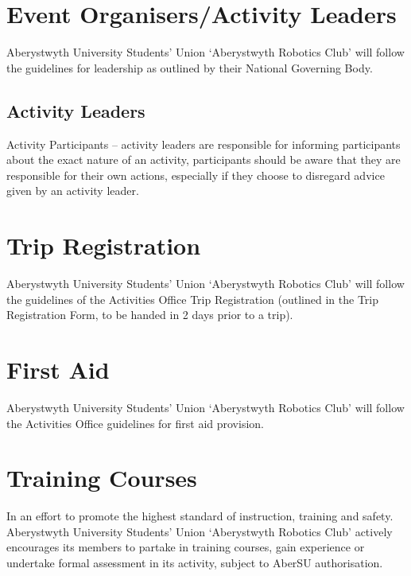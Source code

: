 \documentclass[a4paper,11pt]{article}
\begin{document}
\section{Event Organisers/Activity Leaders}
Aberystwyth University Students' Union `Aberystwyth Robotics Club' will follow the guidelines for leadership as outlined by their National Governing Body.

\subsection{Activity Leaders}
Activity Participants – activity leaders are responsible for informing participants about the exact nature of an activity, participants should be aware that they are responsible for their own actions, especially if they choose to disregard advice given by an activity leader.

\section{Trip Registration}
Aberystwyth University Students' Union `Aberystwyth Robotics Club' will follow the guidelines of the Activities Office Trip Registration (outlined in the Trip Registration Form, to be handed in 2
days prior to a trip).

\section{First Aid}
Aberystwyth University Students' Union `Aberystwyth Robotics Club' will follow the Activities Office guidelines for first aid provision.

\newpage
\section{Training Courses}
In an effort to promote the highest standard of instruction, training and safety. Aberystwyth University Students’ Union ‘Aberystwyth Robotics Club’ actively encourages its members to partake in training courses, gain experience or undertake formal assessment in its activity, subject to AberSU authorisation.
\end{document}
